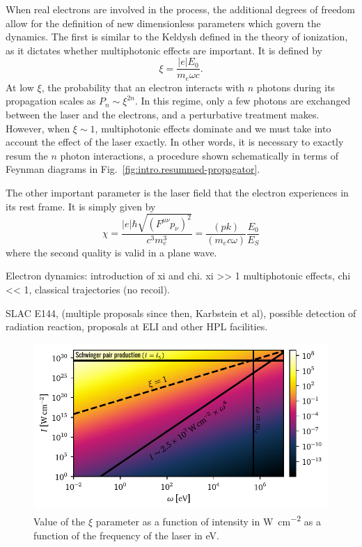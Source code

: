 \documentclass[11pt,SymmetricalJury]{inrsthesis/inrsthesis}
\begin{document}
When real electrons are involved in the process, the additional degrees of freedom
allow for the definition of new dimensionless parameters which govern the dynamics.
The first is similar to the Keldysh defined in the theory of ionization, as it
dictates whether multiphotonic effects are important. It is defined by
  \begin{equation}
    \xi = \frac{|e|E_0}{m_e\omega c}.
  \end{equation}
At low $\xi$, the probability that an electron interacts with $n$ photons
during its propagation scales as $P_n\sim\xi^{2n}$. In this regime,{}
only a few photons are exchanged between the laser and the electrons, and a
perturbative treatment makes. However, when $\xi\sim1$, multiphotonic effects
dominate and we must take into account the effect of the laser exactly.
In other words, it is necessary to exactly resum the $n$ photon interactions,
a procedure shown schematically in terms of Feynman diagrams in Fig.~\ref{fig:intro.resummed-propagator}.

The other important parameter is the laser field that the electron experiences
in its rest frame. It is simply given by
  \begin{equation}
    \chi = \frac{|e|\hbar\sqrt{\left(F^{\mu\nu}p_\nu\right)^2}}{c^3m_e^3} = \frac{(pk)}{(m_e c\omega)}\frac{E_0}{E_S}
  \end{equation}
where the second quality is valid in a plane wave.

Electron dynamics: introduction of xi and chi. xi >> 1 multiphotonic effects,
chi << 1, classical trajectories (no recoil).


SLAC E144, (multiple proposals since then, Karbstein et al), possible
detection of radiation reaction, proposals at ELI and other HPL facilities.



\begin{figure}
  \centering
  \includegraphics{figs/ClassicalLimit.pdf}
  \caption[Map of non-linearity parameters in intensity-frequency space.]
          {Value of the $\xi$ parameter as a function of intensity in \si{\watt\per\cm\squared}
          as a function of the frequency of the laser in \si{\eV}.}
  \label{fig:intro.xi-map}
\end{figure}
\end{document}
